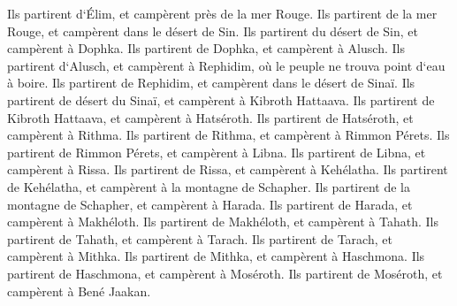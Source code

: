 \verse Ils partirent d`Élim, et campèrent près de la mer Rouge. 
\verse Ils partirent de la mer Rouge, et campèrent dans le désert de Sin. 
\verse Ils partirent du désert de Sin, et campèrent à Dophka. 
\verse Ils partirent de Dophka, et campèrent à Alusch. 
\verse Ils partirent d`Alusch, et campèrent à Rephidim, où le peuple ne trouva point d`eau à boire. 
\verse Ils partirent de Rephidim, et campèrent dans le désert de Sinaï. 
\verse Ils partirent de désert du Sinaï, et campèrent à Kibroth Hattaava. 
\verse Ils partirent de Kibroth Hattaava, et campèrent à Hatséroth. 
\verse Ils partirent de Hatséroth, et campèrent à Rithma. 
\verse Ils partirent de Rithma, et campèrent à Rimmon Pérets. 
\verse Ils partirent de Rimmon Pérets, et campèrent à Libna. 
\verse Ils partirent de Libna, et campèrent à Rissa. 
\verse Ils partirent de Rissa, et campèrent à Kehélatha. 
\verse Ils partirent de Kehélatha, et campèrent à la montagne de Schapher. 
\verse Ils partirent de la montagne de Schapher, et campèrent à Harada. 
\verse Ils partirent de Harada, et campèrent à Makhéloth. 
\verse Ils partirent de Makhéloth, et campèrent à Tahath. 
\verse Ils partirent de Tahath, et campèrent à Tarach. 
\verse Ils partirent de Tarach, et campèrent à Mithka. 
\verse Ils partirent de Mithka, et campèrent à Haschmona. 
\verse Ils partirent de Haschmona, et campèrent à Moséroth. 
\verse Ils partirent de Moséroth, et campèrent à Bené Jaakan. 
